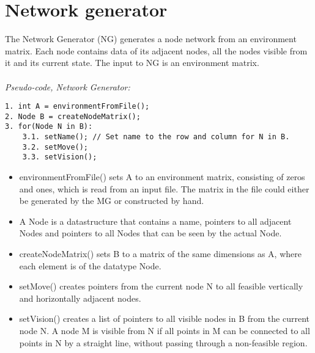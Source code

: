 \section{Network generator}
The Network Generator (NG) generates a node network from an environment matrix. Each node contains data of its adjacent nodes, all the nodes visible from it and its current state. The input to NG is an environment matrix.\\
\\
\noindent \emph{Pseudo-code, Network Generator:}
\begin{verbatim}
1. int A = environmentFromFile();
2. Node B = createNodeMatrix();
3. for(Node N in B):
    3.1. setName(); // Set name to the row and column for N in B.
    3.2. setMove();
    3.3. setVision();
\end{verbatim}
\begin{itemize}
\item environmentFromFile() sets A to an environment matrix, consisting of zeros and ones, which is read from an input file. The matrix in the file could either be generated by the MG or constructed by hand.
\item A Node is a datastructure that contains a name, pointers to all adjacent Nodes and pointers to all Nodes that can be seen by the actual Node.
\item createNodeMatrix() sets B to a matrix of the same dimensions as A, where each element is of the datatype Node.
\item setMove() creates pointers from the current node N to all feasible vertically and horizontally adjacent nodes.
\item setVision() creates a list of pointers to all visible nodes in B from the current node N. A node M is visible from N if all points in M can be connected to all points in N by a straight line, without passing through a non-feasible region.

\end{itemize}